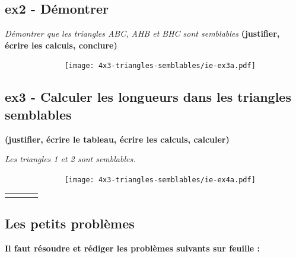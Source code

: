 \begin{minipage}[t]{0.55\textwidth}
  \subsection*{ex2 - Démontrer}
  \textit{Démontrer que les triangles ABC, AHB et BHC sont semblables}
  \textbf{(justifier, écrire les calculs, conclure)}
  \begin{figure}[H]
        \centering
        \texttt{[image: 4x3-triangles-semblables/ie-ex3a.pdf]}
  \end{figure}
\end{minipage}
\begin{minipage}[t]{0.4\textwidth}
  \Pointilles[14]
\end{minipage}

\newpage

\subsection*{ex3 - Calculer les longueurs dans les triangles semblables}
\textbf{(justifier, écrire le tableau, écrire les calculs, calculer)} \newline
\begin{minipage}[t]{0.45\textwidth}
  \textit{Les triangles 1 et 2 sont semblables.} 
  \begin{figure}[H]
        \centering
        \texttt{[image: 4x3-triangles-semblables/ie-ex4a.pdf]}
  \end{figure}
\end{minipage}
\begin{minipage}[t]{0.55\textwidth}
  \begin{tabular}{|c|c|c|c|}
    \hline
    \phantom{$\dfrac{azerty}{1}$} & \phantom{azerty}  & \phantom{azerty} & \phantom{azerty} \\ \hline
    \phantom{$\dfrac{azerty}{1}$} & \phantom{azerty}  & \phantom{azerty} & \phantom{azerty} \\   \hline
  \end{tabular}

  \Pointilles[6]
\end{minipage}


\subsection*{Les petits problèmes}
\textbf{Il faut résoudre et rédiger les problèmes suivants sur feuille :} 

